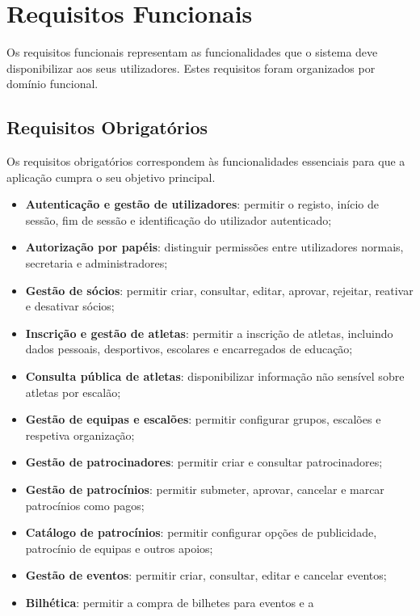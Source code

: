 \section{Requisitos Funcionais}

Os requisitos funcionais representam as funcionalidades que o sistema deve
disponibilizar aos seus utilizadores. Estes requisitos foram organizados por
domínio funcional.

\subsection{Requisitos Obrigatórios}

Os requisitos obrigatórios correspondem às funcionalidades essenciais para que
a aplicação cumpra o seu objetivo principal.

\begin{itemize}
    \item \textbf{Autenticação e gestão de utilizadores}: permitir o registo,
    início de sessão, fim de sessão e identificação do utilizador autenticado;
    \item \textbf{Autorização por papéis}: distinguir permissões entre
    utilizadores normais, secretaria e administradores;
    \item \textbf{Gestão de sócios}: permitir criar, consultar, editar,
    aprovar, rejeitar, reativar e desativar sócios;
    \item \textbf{Inscrição e gestão de atletas}: permitir a inscrição de
    atletas, incluindo dados pessoais, desportivos, escolares e encarregados de
    educação;
    \item \textbf{Consulta pública de atletas}: disponibilizar informação não
    sensível sobre atletas por escalão;
    \item \textbf{Gestão de equipas e escalões}: permitir configurar grupos,
    escalões e respetiva organização;
    \item \textbf{Gestão de patrocinadores}: permitir criar e consultar
    patrocinadores;
    \item \textbf{Gestão de patrocínios}: permitir submeter, aprovar, cancelar
    e marcar patrocínios como pagos;
    \item \textbf{Catálogo de patrocínios}: permitir configurar opções de
    publicidade, patrocínio de equipas e outros apoios;
    \item \textbf{Gestão de eventos}: permitir criar, consultar, editar e
    cancelar eventos;
    \item \textbf{Bilhética}: permitir a compra de bilhetes para eventos e a

\end{itemize}
